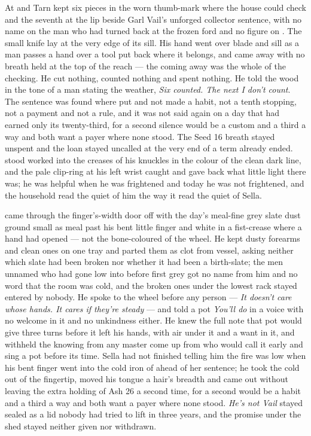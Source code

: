 \scenebreak

At  and  Tarn kept six pieces in the worn thumb-mark where the house could check and the seventh at the lip beside Garl Vail's unforged collector sentence, with no name on the man who had turned back at the frozen ford and no figure on . The small knife lay at the very edge of its sill. His hand went over blade and sill as a man passes a hand over a tool put back where it belongs, and came away with no breath held at the top of the reach --- the coming away was the whole of the checking. He cut nothing, counted nothing and spent nothing. He told the wood in the tone of a man stating the weather, \emph{Six counted. The next I don't count}. The sentence was found where put and not made a habit, not a tenth stopping, not a payment and not a rule, and it was not said again on a day that had earned only its twenty-third, for a second silence would be a custom and a third a way and both want a payer where none stood. The Seed 16 breath stayed unspent and the loan stayed uncalled at the very end of a term already ended.  stood worked into the creases of his knuckles in the colour of the clean dark line, and the pale clip-ring at his left wrist caught and gave back what little light there was; he was helpful when he was frightened and today he was not frightened, and the household read the quiet of him the way it read the quiet of Sella.

 came through the finger's-width door off  with the day's meal-fine grey slate dust ground small as meal past his bent little finger and white in a fist-crease where a hand had opened --- not the bone-coloured  of the wheel. He kept dusty forearms and clean ones on one tray and parted them as clot from vessel, asking neither which slate had been broken nor whether it had been a birth-slate; the men unnamed who had gone low into  before first grey got no name from him and no word that the room was cold, and the broken ones under the lowest rack stayed entered by nobody. He spoke to the wheel before any person --- \emph{It doesn't care whose hands. It cares if they're steady} --- and told a pot \emph{You'll do} in a voice with no welcome in it and no unkindness either. He knew the full note that pot would give three turns before it left his hands, with air under it and a want in it, and withheld the knowing from any master come up from  who would call it early and sing a pot before its time. Sella had not finished telling him the fire was low when his bent finger went into the cold iron of  ahead of her sentence; he took the cold out of the fingertip, moved his tongue a hair's breadth and came out without leaving the extra holding of Ash 26 a second time, for a second would be a habit and a third a way and both want a payer where none stood. \emph{He's not Vail} stayed sealed as a lid nobody had tried to lift in three years, and the promise under the shed stayed neither given nor withdrawn.

